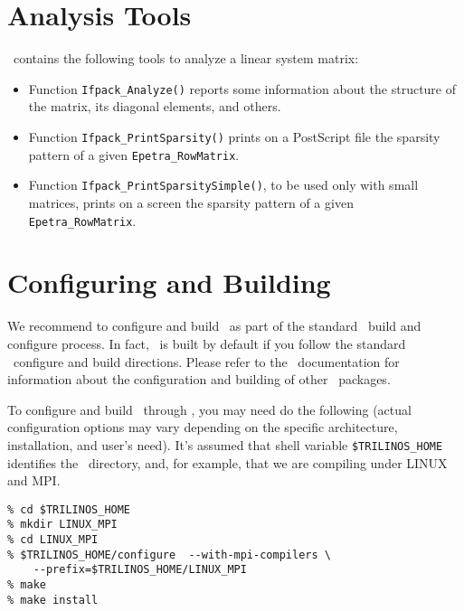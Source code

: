 



\section{Analysis Tools}
\label{sec:analysis}

\ifpack\ contains the following tools to analyze a linear system matrix:
\begin{itemize}
\item Function {\tt Ifpack\_Analyze()} reports some information about the
structure of the matrix, its diagonal elements, and others.
\item Function {\tt Ifpack\_PrintSparsity()} prints on a PostScript file the
sparsity pattern of a given {\tt Epetra\_RowMatrix}.
\item Function {\tt Ifpack\_PrintSparsitySimple()}, to be used only with small
matrices, prints on a screen the
sparsity pattern of a given {\tt Epetra\_RowMatrix}.
\end{itemize}

\section{Configuring and Building \ifpack}
\label{sec:config}

We recommend to configure and build \ifpack\ as part of the standard 
\trilinos~build and configure process.  In fact,
\ifpack\ is built by default if you follow the standard \trilinos~configure
and build directions. Please refer to the \trilinos~documentation 
for information about the configuration and building of
other \trilinos~packages.

\smallskip

To configure and build \ifpack\ through \trilinos, you may need do the
following (actual configuration options may vary depending on the
specific architecture, installation, and user's need).  It's assumed
that shell variable \verb!$TRILINOS_HOME!  identifies the
\trilinos~directory, and, for example, that we are compiling under LINUX
and MPI.
\begin{verbatim}
% cd $TRILINOS_HOME
% mkdir LINUX_MPI
% cd LINUX_MPI
% $TRILINOS_HOME/configure  --with-mpi-compilers \
    --prefix=$TRILINOS_HOME/LINUX_MPI
% make
% make install
\end{verbatim}

